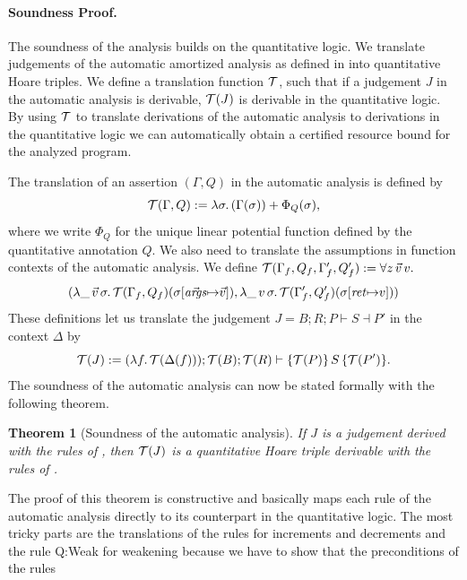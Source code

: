 \documentclass[nocopyrightspace,preprint,pldi]{sigplanconf-pldi15}
\newcommand{\pref}[1]{\prettyref{#1}}
\newtheorem{theorem}{Theorem}
\begin{document}
\paragraph{Soundness Proof.}

The soundness of the analysis builds on the quantitative logic.  We
translate judgements of the automatic amortized analysis as defined in
\pref{fig:auto} into quantitative Hoare triples.  We define a
translation function $\mathcal T$, such that if a judgement $J$ in the
automatic analysis is derivable, $\mathcal T(J)$ is derivable in the
quantitative logic.  By using $\mathcal T$ to translate derivations of the
automatic analysis to derivations in the quantitative logic we can
automatically obtain a certified resource bound for the analyzed
program.

The translation of an assertion $(\Gamma, Q)$ in the automatic
analysis is defined by
$$
  \mathcal T(\Gamma, Q) := \lambda\sigma .\, (\Gamma(\sigma)) + \Phi_Q(\sigma),
$$
where we write $\Phi_Q$ for the unique linear potential function
defined by the quantitative annotation $Q$.  We also need to
translate the assumptions in function contexts of the automatic
analysis.  We define $\mathcal T(\Gamma_f, Q_f, \Gamma'_f, Q'_f) := \forall z \, \vec v \, v . $
%
$$
(
  \lambda \_ \, \vec v \, \sigma .\, \mathcal T(\Gamma_f, Q_f)(\sigma[{\vec {\mathit{args}}} {\mapsto} \vec v]),
  \lambda \_ \, v \, \sigma .\, \mathcal T(\Gamma'_f, Q'_f)(\sigma[{\mathit{ret}} {\mapsto} v])
  )
$$
%
These definitions let us translate the judgement $J = B; R; P \vdash
S \dashv P'$ in the context $\Delta$ by
$$
  \mathcal T(J) :=
  (\lambda f .\, \mathcal T(\Delta(f))); \mathcal T(B); \mathcal T(R) \vdash
    \{\mathcal T(P)\}\, S\, \{\mathcal T(P')\}.
$$
The soundness of the automatic analysis can now be stated
formally with the following theorem.
%
\begin{theorem}[Soundness of the automatic analysis]
  If $J$ is a judgement derived with the rules of
  \pref{fig:auto}, then $\mathcal T(J)$ is a quantitative
  Hoare triple derivable with the rules of
  \pref{fig:logic}.
\end{theorem}
%
\noindent
The proof of this theorem is constructive and basically maps each rule
of the automatic analysis directly to its counterpart in the
quantitative logic.  The most tricky parts are the translations of the
rules for increments and decrements and the rule {\sc Q:Weak} for
weakening because we have to show that the preconditions of the rules
\end{document}
